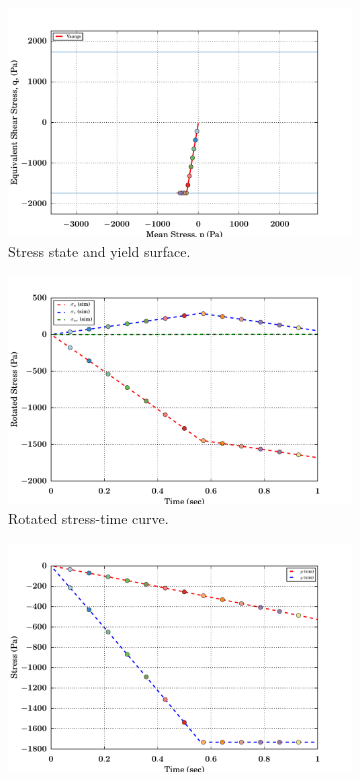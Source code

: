 \begin{figure}[htbp!]
  \begin{subfigure}{0.5\textwidth}
    \centering
    \includegraphics[width=\textwidth]{MPMMaterials/FIGS/UniaxialStrainRotateJ2Lin_yield_surface.pdf}
    \caption{Stress state and yield surface.}
  \end{subfigure}
  \begin{subfigure}{0.5\textwidth}
    \centering
    \includegraphics[width=\textwidth]{MPMMaterials/FIGS/UniaxialStrainRotateJ2Lin_sigma_rot_time.pdf}
    \caption{Rotated stress-time curve.}
  \end{subfigure}
  \begin{subfigure}{0.5\textwidth}
    \centering
    \includegraphics[width=\textwidth]{MPMMaterials/FIGS/UniaxialStrainRotateJ2Lin_pq_time.pdf}

\end{subfigure}
\end{figure}
